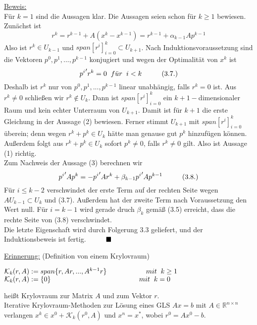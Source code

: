 \documentclass[a4paper]{letter}
\begin{document}
\underline{Beweis:}
\\F\"ur $k = 1$ sind die Aussagen klar. Die Aussagen seien schon f\"ur $k \ge 1$ bewiesen.
\\Zun\"achst ist
$$r^{k} = r^{k-1} + A(x^{k} - x^{k-1}) = r^{k-1} + \alpha_{k-1}Ap^{k-1}$$
Also ist $r^{k} \in U_{k-1}$ und $span[r^{i}]_{i=0}^{k} \subset U_{k+1}$. Nach Induktionsvoraussetzung sind die Vektoren $p^{0},p^{1},...,p^{k-1}$ konjugiert und wegen der Optimalit\"at von $x^{k}$ ist
$${p^{i}}^\prime r^{k} = 0 \hspace{2mm} f\ddot{u}r \hspace{2mm} i < k \hspace{10mm} (3.7.)$$
Deshalb ist $r^{k}$ nur von $p^{0},p^{1},...,p^{k-1}$ linear unabh\"angig, falls $r^{k} = 0$ ist. Aus $r^{k} \ne 0$ schlie{\ss}en wir $r^{k} \notin U_{k}$. Dann ist $span[r^{i}]_{i=0}^{k}$ ein $k+1-$dimensionaler Raum und kein echter Unterraum von $U_{k+1}$. Damit ist für $k+1$ die erste Gleichung in der Aussage (2) bewiesen. Ferner stimmt $U_{k+1}$ mit $span[r^{i}]_{i=0}^{k}$ überein; denn wegen $r^{k} + p^{k} \in U_{k}$ h\"atte man genause gut $p^{k}$ hinzuf\"ugen k\"onnen.
\\Au{\ss}erdem folgt aus $r^{k} + p^{k} \in U_{k}$ sofort $p^{k} \ne 0$, falls $r^{k} \ne 0$ gilt. Also ist Aussage (1) richtig.
\\Zum Nachweis der Aussage (3) berechnen wir
$${p^{i}}^\prime Ap^{k} = -{p^{i}}^\prime Ar^{k} + \beta_{k-1} {p^{i}}^\prime Ap^{k-1}\hspace{10mm} (3.8.)$$
F\"ur $i \le k - 2$ verschwindet der erste Term auf der rechten Seite wegen $AU_{k-1} \subset U_{k}$ und (3.7). Au{\ss}erdem hat der zweite Term nach Voraussetzung den Wert null. F\"ur $i = k - 1$ wird gerade druch $\beta_{k}$ gem\"a{\ss} (3.5) erreicht, dass die rechte Seite von (3.8) verschwindet.
\\Die letzte Eigenschaft wird durch Folgerung 3.3 geliefert, und der Induktionsbeweis ist fertig.$\hspace{10mm} \blacksquare$

\underline{Erinnerung:} (Definition von einem Krylovraum)
\begin{addmargin}[20mm]{20mm}
$\mathcal{K}_{\mathit{k}}(r, A) := span\{r, Ar, ..., A^{k-1}r\} \hspace{20mm} mit \hspace{2mm} k \ge 1$
\\$\mathcal{K}_{\mathit{k}}(r, A) := \{0\} \hspace{45mm} mit \hspace{2mm} k = 0$
\end{addmargin}
hei{\ss}t Krylovraum zur Matrix $A$ und zum Vektor $r$.
\\Iterative Krylovraum-Methoden zur L\"osung eines GLS $Ax = b$ mit $A \in \mathbb{R}^{n \times n}$ verlangen $x^k \in x^{0} + \mathcal{K}_{\mathit{k}}(r^{0}, A)$ und $x^{n} = x^{*}$, wobei $r^{0} = Ax^{0} - b$.
\end{document}
